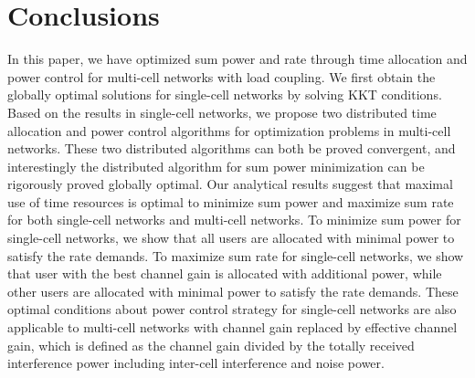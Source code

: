 \documentclass[journal]{IEEEtran}
\begin{document}
\section{Conclusions}
In this paper, we have optimized sum power and rate through time allocation and power control for multi-cell networks with load coupling.
We first obtain the globally optimal solutions for single-cell networks by solving KKT conditions.
Based on the results in single-cell networks, we propose two distributed time allocation and power control algorithms for optimization problems in multi-cell networks.
These two distributed algorithms can both be proved convergent, and interestingly the distributed algorithm for sum power minimization can be rigorously proved globally optimal.
Our analytical results suggest that maximal use of time resources is optimal to minimize sum power and maximize sum rate for both single-cell networks and multi-cell networks.
To minimize sum power for single-cell networks, we show that all users are allocated with minimal power to satisfy the rate demands.
To maximize sum rate for single-cell networks, we show that user with the best channel gain is allocated with additional power, while other users are allocated with minimal power to satisfy the rate demands.
These optimal conditions about power control strategy for single-cell networks are also applicable to multi-cell networks with channel gain replaced by effective channel gain, which is defined as the channel gain divided by the totally received interference power including inter-cell interference and noise power.
\appendices
\end{document}
